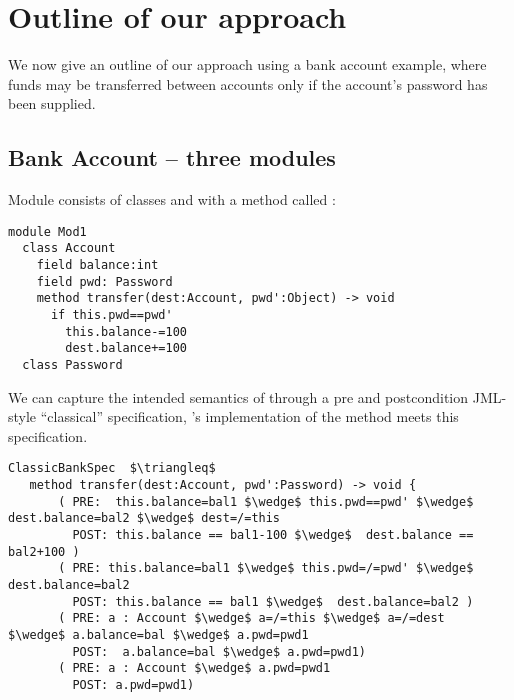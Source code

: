 

\section{Outline of our approach}
\label{s:outline}
We now give an outline of our approach using a bank account example,   where funds may be transferred between accounts only if the account's password has been supplied.


 \subsection{Bank Account -- three modules}
\label{s:bank}
  
Module    consists   of classes   and  
with a method called :
%
%
%
%
% 
\begin{lstlisting}[language=Chainmail, frame=lines]
module Mod1
  class Account
    field balance:int 
    field pwd: Password
    method transfer(dest:Account, pwd':Object) -> void
      if this.pwd==pwd'
        this.balance-=100
        dest.balance+=100
  class Password
\end{lstlisting}
%
\noindent 
We can capture the intended
semantics of %
through  a pre and postcondition 
JML-style\cite{Leavens-etal07}  ``classical''
specification, 
's implementation of the  method meets
this specification.



\begin{lstlisting}[mathescape=true, frame=lines, language=Chainmail]
ClassicBankSpec  $\triangleq$
   method transfer(dest:Account, pwd':Password) -> void {
       ( PRE:  this.balance=bal1 $\wedge$ this.pwd==pwd' $\wedge$ dest.balance=bal2 $\wedge$ dest=/=this 
         POST: this.balance == bal1-100 $\wedge$  dest.balance == bal2+100 )
       ( PRE: this.balance=bal1 $\wedge$ this.pwd=/=pwd' $\wedge$ dest.balance=bal2
         POST: this.balance == bal1 $\wedge$  dest.balance=bal2 )
       ( PRE: a : Account $\wedge$ a=/=this $\wedge$ a=/=dest  $\wedge$ a.balance=bal $\wedge$ a.pwd=pwd1
         POST:  a.balance=bal $\wedge$ a.pwd=pwd1)
       ( PRE: a : Account $\wedge$ a.pwd=pwd1  
         POST: a.pwd=pwd1)       
\end{lstlisting}
 
